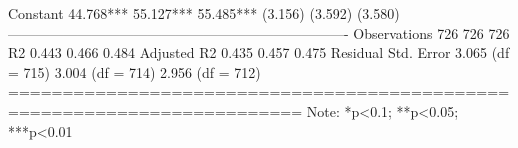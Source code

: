                                         Constant                  44.768***        55.127***        55.485***                                (3.156)          (3.592)          (3.580)                                                                                ------------------------------------------------------------------------- Observations                 726              726              726        R2                          0.443            0.466            0.484       Adjusted R2                 0.435            0.457            0.475       Residual Std. Error    3.065 (df = 715) 3.004 (df = 714) 2.956 (df = 712) ========================================================================= Note:                                         *p<0.1; **p<0.05; ***p<0.01